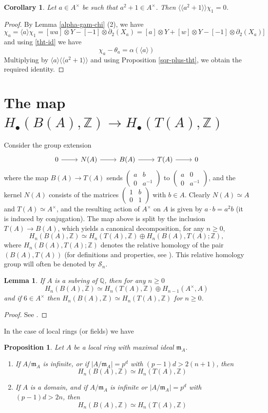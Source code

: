 \documentclass[11pt]{amsart}
\theoremstyle{definition}
\theoremstyle{plain}
\newtheorem{lem}[ntn]{Lemma}
\newtheorem{prp}[ntn]{Proposition}
\newtheorem{cor}[ntn]{Corollary}
\numberwithin{equation}{section}
\newcommand{\z}{\mathbb{Z}}
\newcommand{\q}{\mathbb{Q}}
\renewcommand{\SS}{\mathcal{S}}
\newcommand{\mmm}{\mathfrak{m}}
\renewcommand{\aa}{{A^\times}}
\newcommand{\lan}{\langle}
\newcommand{\ran}{\rangle}
\newcommand{\Lan}{\langle \! \langle}
\newcommand{\Ran}{\rangle \! \rangle}
\newcommand{\mtxx}[4]
{\left(\!\!
\begin{array}{cc}
\!\!#1 & \!\!#2\\
\!\!#3 & \!\!#4
\end{array}\!\!
\right)}
\begin{document}
\begin{cor}
    \label{sqr-plus-chi}
    Let $a\in\aa$ be such that $a^2+1\in\aa$. Then $\Lan a^2+1\Ran\chi_1=0$.
\end{cor}
\begin{proof}
    By Lemma \ref{alpha-gam-chi} (2), we have
    \[
    \chi_a=\lan a\ran\chi_1=[wa]\otimes Y-[-1]\otimes\partial_2(X_a)=[a]\otimes Y+[w]\otimes Y-[-1]\otimes\partial_2(X_a)]
    \]
    and using \eqref{tht-id} we have
    \[
    \chi_a-\theta_a=\alpha(\lan a\ran)
    \]
    Multiplying by $\lan a\ran\Lan a^2+1\Ran$ and using Proposition \ref{sqr-plus-tht}, we obtain the required identity.
\end{proof}
\section{The map \texorpdfstring{$H_\bullet(B(A),\z)\to H_\bullet(T(A),\z)$}{H.(B)->H.(T)}}\label{sec-hb-ht}
Consider the group extension
\[
    \begin{tikzcd}
        0\ar[r] & N(A)\ar[r] & B(A) \ar[r] & T(A)\ar[r] & 0
    \end{tikzcd}
\]
where the map $B(A)\to T(A)$ sends $\mtxx{a}{b}{0}{a^{-1}}$ to $\mtxx{a}{0}{0}{a^{-1}}$, and the kernel $N(A)$ consists of the matrices $\mtxx{1}{b}{0}{1}$ with $b\in A$. Clearly $N(A)\simeq A$ and $T(A)\simeq\aa$, and the resulting action of $\aa$ on $A$ is given by $a\cdot b=a^2b$ (it is induced by conjugation).
The map above is split by the inclusion $T(A)\to B(A)$, which yields a canonical decomposition, for any $n\geq 0$,
\[
    H_n(B(A),\z)\simeq H_n(T(A),\z)\oplus H_n(B(A),T(A);\z),
\]
where $H_n(B(A),T(A);\z)$ denotes the relative homology of the pair $(B(A),T(A))$ (for definitions and properties, see \cite[page 153]{knudson2001}). This relative homology group will often be denoted by $\SS_n$.
\begin{lem}
    \label{ht-hb-l1}
    If $A$ is a subring of $\q$, then for any $n\geq 0$
    \[ 
        H_n(B(A),\z)\simeq H_n(T(A),\z)\oplus H_{n-1}(\aa,A)
    \]
    and if $6\in\aa$ then $H_n(B(A),\z)\simeq H_n(T(A),\z)$ for $n\geq 0$.
\end{lem}
\begin{proof}
    See \cite[Lemma 3.5]{B-E--2023}.
\end{proof}
In the case of local rings (or fields) we have
\begin{prp}\label{ht-hb-local}
    Let $A$ be a local ring with maximal ideal $\mmm_A$.
    \begin{enumerate}
        \item If $A/\mmm_A$ is infinite, or if $|A/\mmm_A|=p^d$ with $(p-1)d>2(n+1)$, then
        \[
            H_n(B(A),\z)\simeq H_n(T(A),\z)
        \]
        \item If $A$ is a domain, and if $A/\mmm_A$ is infinite or $|A/\mmm_A|=p^d$ with $(p-1)d>2n$, then
        \[
            H_n(B(A),\z)\simeq H_n(T(A),\z)
        \] 
    \end{enumerate}
\end{prp}
\end{document}
